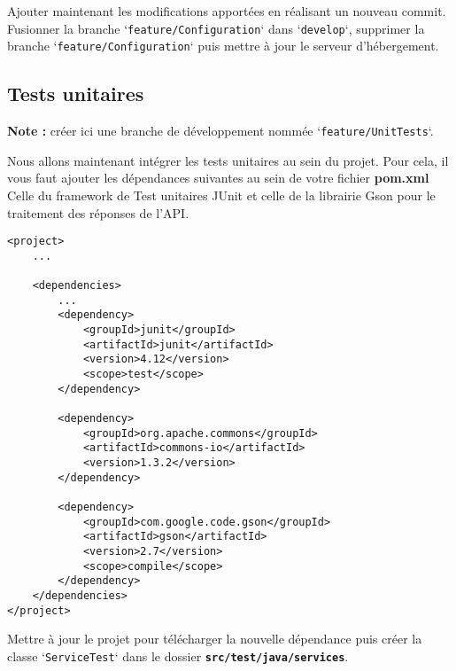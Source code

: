 \documentclass[11pt,a4paper,oneside]{article}
\begin{document}
\vspace{5mm}
Ajouter maintenant les modifications apportées en réalisant un nouveau commit. Fusionner la branche `\texttt{feature/Configuration}` dans `\texttt{develop}`, supprimer la branche `\texttt{feature/Configuration}` puis mettre à jour le serveur d'hébergement.


\subsection{Tests unitaires}

\textbf{Note :} créer ici une branche de développement nommée `\texttt{feature/UnitTests}`.

\vspace{5mm}

Nous allons maintenant intégrer les tests unitaires au sein du projet. Pour cela, il vous faut ajouter les dépendances suivantes au sein de votre fichier \textbf{pom.xml} Celle du framework de Test unitaires JUnit et celle de la librairie Gson pour le traitement des réponses de l'API.


\begin{lstlisting}[style=customXML]
<project>
	...
	
	<dependencies>
		...		
		<dependency>
			<groupId>junit</groupId>
			<artifactId>junit</artifactId>
			<version>4.12</version>
			<scope>test</scope>
		</dependency>
		
		<dependency>
			<groupId>org.apache.commons</groupId>
			<artifactId>commons-io</artifactId>
			<version>1.3.2</version>
		</dependency>
		
        <dependency>
			<groupId>com.google.code.gson</groupId>
			<artifactId>gson</artifactId>
			<version>2.7</version>
			<scope>compile</scope>
		</dependency>
	</dependencies>
</project>
\end{lstlisting}

\vspace{5mm}
Mettre à jour le projet pour télécharger la nouvelle dépendance puis créer la classe `\texttt{ServiceTest}` dans le dossier \textbf{\texttt{src/test/java/services}}. 
\end{document}

